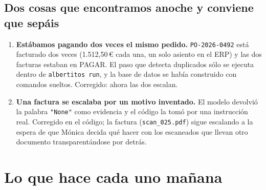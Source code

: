 \documentclass[11pt,a4paper]{article}
\newcommand{\cmd}[1]{\texttt{\small #1}}
\begin{document}
\subsection{Dos cosas que encontramos anoche y conviene que sepáis}

\begin{enumerate}
  \item \textbf{Estábamos pagando dos veces el mismo pedido.} \cmd{PO-2026-0492} está facturado dos veces
        (1.512,50\,€ cada una, un solo asiento en el ERP) y las dos facturas estaban en PAGAR. El paso que
        detecta duplicados sólo se ejecuta dentro de \cmd{albertitos run}, y la base de datos se había
        construido con comandos sueltos. Corregido: ahora las dos escalan.
  \item \textbf{Una factura se escalaba por un motivo inventado.} El modelo devolvió la palabra
        \texttt{"None"} como evidencia y el código la tomó por una instrucción real. Corregido en el código;
        la factura (\cmd{scan\_025.pdf}) sigue escalando a la espera de que Mónica decida qué hacer con los
        escaneados que llevan otro documento transparentándose por detrás.
\end{enumerate}

\section{Lo que hace cada uno mañana}
\label{sec:timeline}
\end{document}
